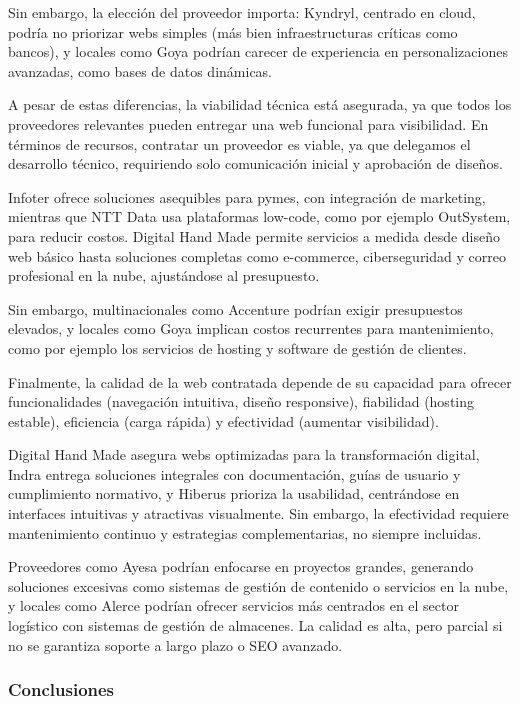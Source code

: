 \documentclass[11.5pt]{article}
\begin{document}
	Sin embargo, la elección del proveedor importa: Kyndryl, centrado en cloud, podría no priorizar webs simples
	(más bien infraestructuras críticas como bancos), y locales como Goya podrían carecer de experiencia en
	personalizaciones avanzadas, como bases de datos dinámicas.
	
	A pesar de estas diferencias, la viabilidad técnica está asegurada, ya que todos los proveedores relevantes
	pueden entregar una web funcional para visibilidad. En términos de recursos, contratar un proveedor es
	viable, ya que delegamos el desarrollo técnico, requiriendo solo comunicación inicial y aprobación de diseños.
	
	Infoter ofrece soluciones asequibles para pymes, con integración de marketing, mientras que NTT Data usa
	plataformas low-code, como por ejemplo OutSystem, para reducir costos. Digital Hand Made permite servicios
	a medida desde diseño web básico hasta soluciones completas como e-commerce, ciberseguridad y correo
	profesional en la nube, ajustándose al presupuesto.
	
	Sin embargo, multinacionales como Accenture podrían exigir presupuestos elevados, y locales como Goya
	implican costos recurrentes para mantenimiento, como por ejemplo los servicios de hosting y software de
	gestión de clientes.
	
	Finalmente, la calidad de la web contratada depende de su capacidad para ofrecer funcionalidades
	(navegación intuitiva, diseño responsive), fiabilidad (hosting estable), eficiencia (carga rápida) y efectividad (aumentar visibilidad).
	
	Digital Hand Made asegura webs optimizadas para la transformación digital, Indra entrega soluciones
	integrales con documentación, guías de usuario y cumplimiento normativo, y Hiberus prioriza la usabilidad,
	centrándose en interfaces intuitivas y atractivas visualmente. Sin embargo, la efectividad requiere
	mantenimiento continuo y estrategias complementarias, no siempre incluidas.
	
	Proveedores como Ayesa podrían enfocarse en proyectos grandes, generando soluciones excesivas como
	sistemas de gestión de contenido o servicios en la nube, y locales como Alerce podrían ofrecer servicios más
	centrados en el sector logístico con sistemas de gestión de almacenes. La calidad es alta, pero parcial si no
	se garantiza soporte a largo plazo o SEO avanzado.
	
	\subsubsection{Conclusiones}
	
\end{document}
